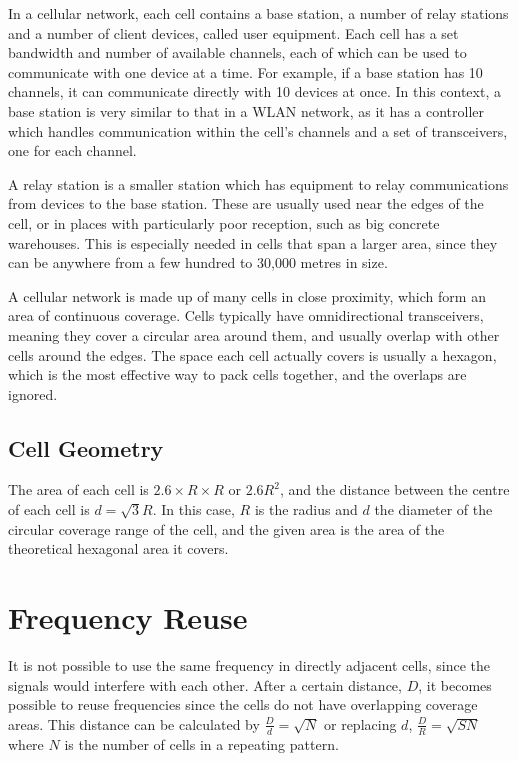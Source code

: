 
In a cellular network, each cell contains a base station, a number of relay stations and a number of client devices,
 called user equipment. Each cell has a set bandwidth and number of available channels, each of which can be used to
 communicate with one device at a time. For example, if a base station has 10 channels, it can communicate directly with
 10 devices at once. In this context, a base station is very similar to that in a WLAN network, as it has a controller
 which handles communication within the cell's channels and a set of transceivers, one for each channel.

A relay station is a smaller station which has equipment to relay communications from devices to the base station. These
 are usually used near the edges of the cell, or in places with particularly poor reception, such as big concrete
 warehouses. This is especially needed in cells that span a larger area, since they can be anywhere from a few hundred
 to 30,000 metres in size.

A cellular network is made up of many cells in close proximity, which form an area of continuous coverage. Cells
 typically have omnidirectional transceivers, meaning they cover a circular area around them, and usually overlap with
 other cells around the edges. The space each cell actually covers is usually a hexagon, which is the most effective way
 to pack cells together, and the overlaps are ignored.

\subsection*{Cell Geometry}

The area of each cell is $2.6 \times R \times R$ or $2.6{R}^2$, and the distance between the centre of each cell is
 $d = \sqrt{3}R$. In this case, $R$ is the radius and $d$ the diameter of the circular coverage range of the cell, and
 the given area is the area of the theoretical hexagonal area it covers.

\section*{Frequency Reuse}

It is not possible to use the same frequency in directly adjacent cells, since the signals would interfere with each
 other. After a certain distance, $D$, it becomes possible to reuse frequencies since the cells do not have overlapping
 coverage areas. This distance can be calculated by $\frac{D}{d} = \sqrt{N}$ or replacing $d$, $\frac{D}{R} = \sqrt{SN}$
 where $N$ is the number of cells in a repeating pattern.

